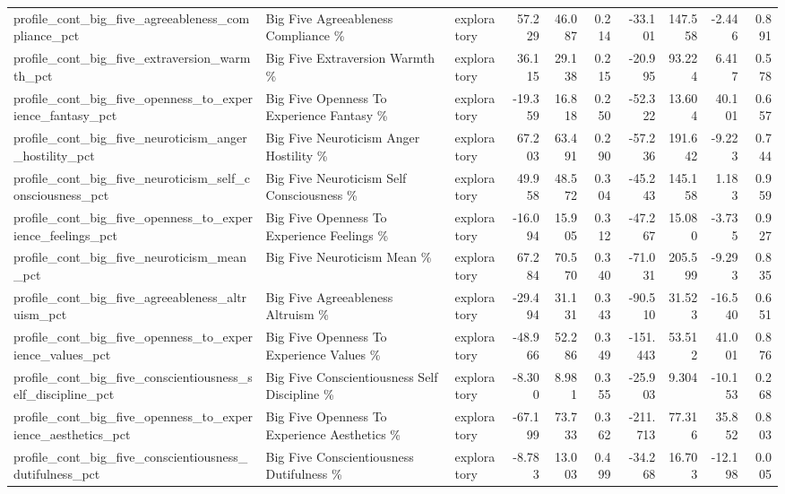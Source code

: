 \begin{table}[htbp]
\begin{threeparttable}
\begin{tabular}{lllrrrrrrr}
profile\_cont\_big\_five\_agreeableness\_compliance\_pct & Big Five Agreeableness Compliance \% & exploratory & 57.229 & 46.087 & 0.214 & -33.101 & 147.558 & -2.446 & 0.891 \\
profile\_cont\_big\_five\_extraversion\_warmth\_pct & Big Five Extraversion Warmth \% & exploratory & 36.115 & 29.138 & 0.215 & -20.995 & 93.224 & 6.417 & 0.578 \\
profile\_cont\_big\_five\_openness\_to\_experience\_fantasy\_pct & Big Five Openness To Experience Fantasy \% & exploratory & -19.359 & 16.818 & 0.250 & -52.322 & 13.604 & 40.101 & 0.657 \\
profile\_cont\_big\_five\_neuroticism\_anger\_hostility\_pct & Big Five Neuroticism Anger Hostility \% & exploratory & 67.203 & 63.491 & 0.290 & -57.236 & 191.642 & -9.223 & 0.744 \\
profile\_cont\_big\_five\_neuroticism\_self\_consciousness\_pct & Big Five Neuroticism Self Consciousness \% & exploratory & 49.958 & 48.572 & 0.304 & -45.243 & 145.158 & 1.183 & 0.959 \\
profile\_cont\_big\_five\_openness\_to\_experience\_feelings\_pct & Big Five Openness To Experience Feelings \% & exploratory & -16.094 & 15.905 & 0.312 & -47.267 & 15.080 & -3.735 & 0.927 \\
profile\_cont\_big\_five\_neuroticism\_mean\_pct & Big Five Neuroticism Mean \% & exploratory & 67.284 & 70.570 & 0.340 & -71.031 & 205.599 & -9.293 & 0.835 \\
profile\_cont\_big\_five\_agreeableness\_altruism\_pct & Big Five Agreeableness Altruism \% & exploratory & -29.494 & 31.131 & 0.343 & -90.510 & 31.523 & -16.540 & 0.651 \\
profile\_cont\_big\_five\_openness\_to\_experience\_values\_pct & Big Five Openness To Experience Values \% & exploratory & -48.966 & 52.286 & 0.349 & -151.443 & 53.512 & 41.001 & 0.876 \\
profile\_cont\_big\_five\_conscientiousness\_self\_discipline\_pct & Big Five Conscientiousness Self Discipline \% & exploratory & -8.300 & 8.981 & 0.355 & -25.903 & 9.304 & -10.153 & 0.268 \\
profile\_cont\_big\_five\_openness\_to\_experience\_aesthetics\_pct & Big Five Openness To Experience Aesthetics \% & exploratory & -67.199 & 73.733 & 0.362 & -211.713 & 77.316 & 35.852 & 0.803 \\
profile\_cont\_big\_five\_conscientiousness\_dutifulness\_pct & Big Five Conscientiousness Dutifulness \% & exploratory & -8.783 & 13.003 & 0.499 & -34.268 & 16.703 & -12.198 & 0.005 \\

\end{tabular}
\end{threeparttable}
\end{table}
